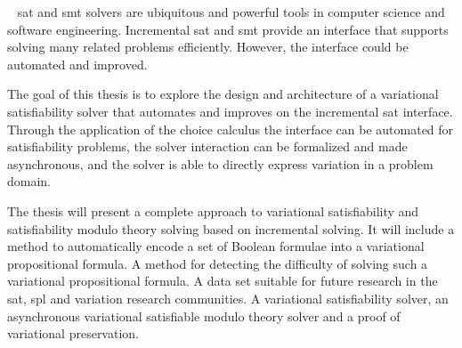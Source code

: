 ~\label{chapter:conclusion}
\ac{sat} and \ac{smt} solvers are ubiquitous and powerful tools in computer
science and software engineering. Incremental \ac{sat} and \ac{smt} provide an
interface that supports solving many related problems efficiently. However, the
interface could be automated and improved.

The goal of this thesis is to explore the design and architecture of a
variational satisfiability solver that automates and improves on the incremental
\ac{sat} interface. Through the application of the choice calculus the interface
can be automated for satisfiability problems, the solver interaction can be
formalized and made asynchronous, and the solver is able to directly express
variation in a problem domain.

The thesis will present a complete approach to variational satisfiability and
satisfiability modulo theory solving based on incremental solving. It will
include a method to automatically encode a set of Boolean formulae into a
variational propositional formula. A method for detecting the difficulty of
solving such a variational propositional formula. A data set suitable for future
research in the \ac{sat}, \ac{spl} and variation research communities. A
variational satisfiability solver, an asynchronous variational satisfiable
modulo theory solver and a proof of variational preservation.

